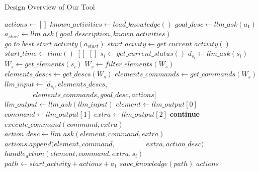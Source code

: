 \documentclass[conference]{IEEEtran}
\begin{document}
\begin{algorithm}
\caption{Design Overview of Our Tool}
\label{alg_overview}
\begin{algorithmic}
    \State $actions \gets []$
    \State $known\_activities \gets load\_knowledge()$
    \State $goal\_desc \gets llm\_ask(a_1)$
    \Statex $a_{start} \gets llm\_ask(goal\_description, known\_activities)$
    \State $go\_to\_best\_start\_activity(a_{start})$
    \State $start\_acivity \gets get\_current\_activity()$
    \State $start\_time \gets time()$
            \State \Return $[]$
        \EndIf
            \State \Return $[]$
        \EndIf
        \State $s_i \gets get\_current\_status()$
        \State $d_{s_i} \gets llm\_ask(s_i)$
        \State $W_s \gets get\_elements(s_i)$
        \State $W_s \gets filter\_elements(W_s)$
        \State $elements\_descs \gets get\_descs(W_s)$
        \State $elements\_commands \gets get\_commands(W_s)$
        \State $llm\_input \gets [d_{s_i}, elements\_descs, $
        \Statex $\qquad \qquad elements\_commands, goal\_desc, actions]$
        \State $llm\_output \gets llm\_ask(llm\_input)$
        \State $element \gets llm\_output[0]$
        \State $command \gets llm\_output[1]$
        \State $extra \gets llm\_output[2]$
            \State \textbf{continue}
        \EndIf
        \State $execute\_command(command, extra)$
        \State $action\_desc \gets llm\_ask(element, command, extra)$
        \State $actions.append(element, command, $
        \Statex $\qquad \qquad extra, action\_desc)$
        \State $handle_action(element, command, extra, s_i)$
    \EndWhile
        \State $path \gets start\_activity + actions + a_1$
        \State $save\_knowledge(path)$
        \State \Return $actions$
    \EndIf
\end{algorithmic}
\end{algorithm}
\end{document}
